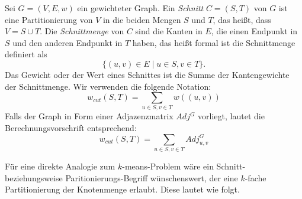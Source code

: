 \begin{definition}
	Sei $G=(V,E,w)$ ein gewichteter Graph. Ein \emph{Schnitt} $C=(S,T)$ von $G$ ist eine Partitionierung von $V$ in die beiden
	Mengen $S$ und $T$, das heißt, dass $V = S \cup T$. Die \emph{Schnittmenge} von $C$ sind die Kanten in $E$, die einen
	Endpunkt in $S$ und den anderen Endpunkt in $T$ haben, das heißt formal ist die Schnittmenge definiert als
	\[ \{ (u,v) \in E \mid u \in S, v \in T \}. \]
	Das Gewicht oder der Wert eines Schnittes ist die Summe der Kantengewichte der Schnittmenge. Wir verwenden die folgende
	Notation:
	\[ w_{cut}(S,T) = \sum_{u \in S, v \in T} w((u,v)) \]
	Falls der Graph in Form einer Adjazenzmatrix $Adj^G$ vorliegt, lautet die Berechnungsvorschrift entsprechend:
	\[ w_{cut}(S,T) = \sum_{u \in S, v \in T} Adj^G_{u,v} \]
\end{definition}
Für eine direkte Analogie zum $k$-means-Problem wäre ein Schnitt- beziehungsweise Paritionierungs-Begriff wünschenswert,
der eine $k$-fache Partitionierung der Knotenmenge erlaubt. Diese lautet wie folgt.

